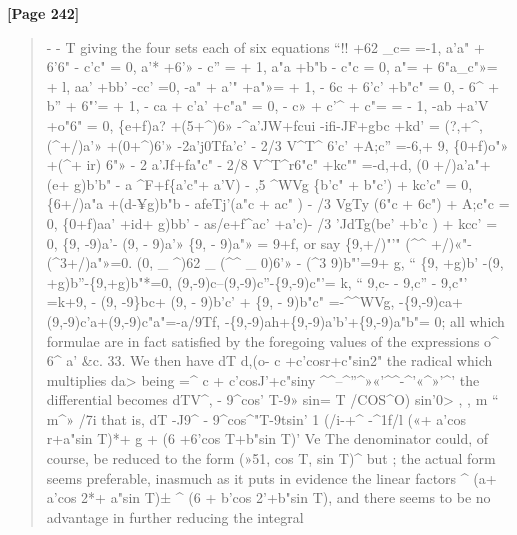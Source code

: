 \documentclass[11pt,a4paper]{book}
\begin{document}
\textbf{[Page 242]}\\[0.2cm]
\begin{quote}
- - T
giving the four sets each of six equations
``!! +62 \_c= =-1, a'a" + 6'6" - c'c" = 0,
a'* +6'» - c'' = + 1, a"a +b"b - c"c = 0,
a"= + 6"a\_c"»= + l, aa' +bb' -cc' =0,
-a" + a'" +a"»= + 1, - 6c + 6'c' +b"c" = 0,
- 6\textasciicircum{} + b'' + 6"'= + 1, - ca + c'a' +c"a" = 0,
-
c»
+
c'\textasciicircum{}
+
c"=
= -
1,
-ab +a'V +o"6" =
0,
\{e+f)a? +(5+\textasciicircum{})6» -\textasciicircum{}a'JW+fcui -ifi-JF+gbc +kd' = (?,+\textasciicircum{},
(\textasciicircum{}+/)a'» +(0+\textasciicircum{})6'» -2a'j0Tfa'c' - 2/3 V\textasciicircum{}T\textasciicircum{} 6'c' +A;c'' =-6,+ 9,
\{0+f)o"» +(\textasciicircum{}+ ir) 6"» - 2 a'Jf+fa"c" - 2/8 V\textasciicircum{}T\textasciicircum{}r6"c" +kc"" =-d,+d,
(0 +/)a'a"+(e+ g)b'b" - a \textasciicircum{}F+f\{a'c"+ a'V) - ,5 \textasciicircum{}WVg \{b'c" + b"c') + kc'c" = 0,
\{6+/)a"a +(d-¥g)b"b - afeTj'(a"c + ac" ) - /3 VgTy (6"c + 6c") + A;c"c = 0,
\{0+f)aa' +id+ g)bb' - as/e+f\textasciicircum{}ac' +a'c)- /3 'JdTg(be' +b'c ) + kcc' = 0,
\{9, -9)a'- (9, - 9)a'» \{9, - 9)a"» = 9+f, or say \{9,+/)"'" (\textasciicircum{}\textasciicircum{} +/)«"-(\textasciicircum{}3+/)a"»=0.
(0, \_ \textasciicircum{})62 \_ (\textasciicircum{}\textasciicircum{} \_ 0)6'» - (\textasciicircum{}3 9)b"'=9+ g, `` \{9, +g)b' -(9, +g)b''-\{9,+g)b"*=0,
(9,-9)c--(9,-9)c''-\{9,-9)c"'= k, `` 9,c- - 9,c'' - 9,c"' =k+9,
- (9, -9\}bc+ (9, - 9)b'c' + \{9, - 9)b"c" =-\textasciicircum{}\textasciicircum{}WVg,
-\{9,-9)ca+(9,-9)c'a+(9,-9)c"a"=-a/9Tf,
-\{9,-9)ah+\{9,-9)a'b'+\{9,-9)a"b"= 0;
all which formulae are in fact satisfied by the foregoing values of the expressions
o\textasciicircum{} 6\textasciicircum{} a' \&c.
33. We then have
dT
d,(o-
c
+c'cosr+c"sin2"
the radical which multiplies da> being
=\textasciicircum{} c + c'cosJ'+c"siny \textasciicircum{}\textasciicircum{}--\textasciicircum{}''\textasciicircum{}»«'\textasciicircum{}\textasciicircum{}-\textasciicircum{}'«\textasciicircum{}»'\textasciicircum{}'
the differential becomes
dTV\textasciicircum{}, -
9\textasciicircum{}cos'
T-9»
sin=
T
/COS\textasciicircum{}O) sin'0> , , m `` m\textasciicircum{}» /7i
that is,
dT
-J9\textasciicircum{}
- 9\textasciicircum{}cos\textasciicircum{}"T-9tsin'
1 (/i-+\textasciicircum{} -\textasciicircum{}1f/l («+ a'cos r+a"sin T)*+ g + (6 +6'cos T+b"sin T)'  Ve
The denominator could, of course, be reduced to the form (»51, cos T, sin T)\textasciicircum{} but
;
the actual form seems preferable, inasmuch as it puts in evidence the linear factors
\textasciicircum{} (a+ a'cos 2*+ a"sin T)± \textasciicircum{} (6 + b'cos 2'+b"sin T),
and there seems to be no advantage in further reducing the integral
\end{quote}
\end{document}
